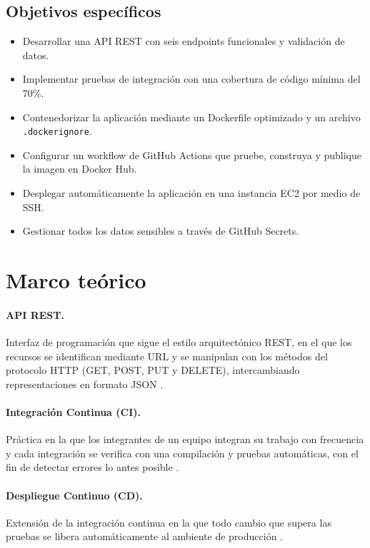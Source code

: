 \documentclass[12pt,letterpaper]{article}
\begin{document}
\subsection{Objetivos específicos}
\begin{itemize}
  \item Desarrollar una API REST con seis endpoints funcionales y validación de datos.
  \item Implementar pruebas de integración con una cobertura de código mínima del 70\%.
  \item Contenedorizar la aplicación mediante un Dockerfile optimizado y un archivo \texttt{.dockerignore}.
  \item Configurar un workflow de GitHub Actions que pruebe, construya y publique la imagen en Docker Hub.
  \item Desplegar automáticamente la aplicación en una instancia EC2 por medio de SSH.
  \item Gestionar todos los datos sensibles a través de GitHub Secrets.
\end{itemize}

\section{Marco teórico}

\paragraph{API REST.} Interfaz de programación que sigue el estilo arquitectónico REST, en el que los recursos se identifican mediante URL y se manipulan con los métodos del protocolo HTTP (GET, POST, PUT y DELETE), intercambiando representaciones en formato JSON \cite{fielding}.

\paragraph{Integración Continua (CI).} Práctica en la que los integrantes de un equipo integran su trabajo con frecuencia y cada integración se verifica con una compilación y pruebas automáticas, con el fin de detectar errores lo antes posible \cite{fowler}.

\paragraph{Despliegue Continuo (CD).} Extensión de la integración continua en la que todo cambio que supera las pruebas se libera automáticamente al ambiente de producción \cite{humble}.
\end{document}
